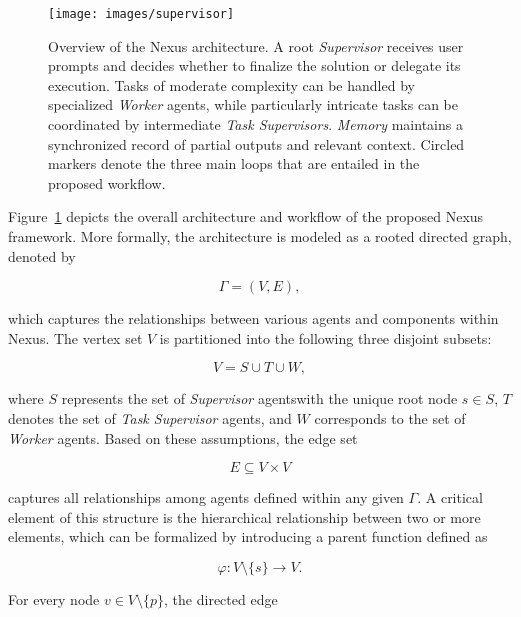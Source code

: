 \begin{figure}[h]
    \centering
    \texttt{[image: images/supervisor]}
    \caption{Overview of the Nexus architecture. A root {\em Supervisor} receives user prompts and decides whether to finalize the solution or delegate its execution. Tasks of moderate complexity can be handled by specialized {\em Worker} agents, while particularly intricate tasks can be coordinated by intermediate {\em Task Supervisors}. \emph{Memory} maintains a synchronized record of partial outputs and relevant context. Circled markers denote the three main loops that are entailed in the proposed workflow.}
    \label{fig:nexus}
\end{figure}

Figure~\ref{fig:nexus} depicts the overall architecture and workflow of the proposed Nexus framework. More formally, the architecture is modeled as a rooted directed graph, denoted by 

\begin{equation}
\Gamma = (V, E),
\end{equation}

which captures the relationships between various agents and components within Nexus. The vertex set $V$ is partitioned into the following three disjoint subsets:

\begin{equation}
V = S \cup T \cup W,
\end{equation}

where $S$ represents the set of {\em Supervisor} agents\textemdash with the unique root node $s \in S$\textemdash, $T$ denotes the set of {\em Task Supervisor} agents, and $W$ corresponds to the set of {\em Worker} agents. Based on these assumptions, the edge set

\begin{equation}
E \subseteq V \times V
\end{equation}

captures all relationships among agents defined within any given $\Gamma$. A critical element of this structure is the hierarchical relationship between two or more elements, which can be formalized by introducing a parent function defined as 

\begin{equation}
\varphi \colon V \setminus \{s\} \to V.
\end{equation}

For every node $v \in V \setminus \{p\}$, the directed edge 


